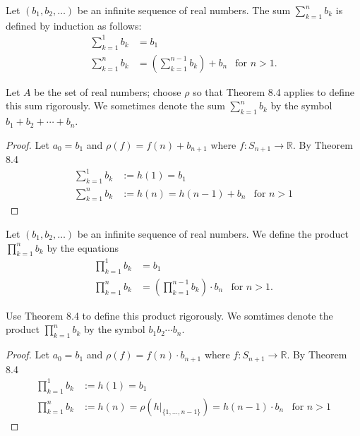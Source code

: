 \begin{exercise}\label{chapter1:section8:exercise1}
    Let $(b_{1}, b_{2}, \ldots)$ be an infinite sequence of real numbers. The sum $\sum^{n}_{k=1}b_{k}$ is defined by induction as follows:
    \begin{align*}
        \sum^{1}_{k=1}b_{k} & = b_{1}                                                            \\
        \sum^{n}_{k=1}b_{k} & = \left(\sum^{n-1}_{k=1}b_{k}\right) + b_{n} & \text{for $n > 1$.}
    \end{align*}

    Let $A$ be the set of real numbers; choose $\rho$ so that Theorem 8.4 applies to define this sum rigorously. We sometimes denote the sum $\sum^{n}_{k=1}b_{k}$ by the symbol $b_{1} + b_{2} + \cdots + b_{n}$.
\end{exercise}

\begin{proof}
    Let $a_{0} = b_{1}$ and $\rho(f) = f(n) + b_{n+1}$ where $f: S_{n+1}\to \mathbb{R}$. By Theorem 8.4
    \begin{align*}
        \sum^{1}_{k=1}b_{k} & := h(1) = b_{1}                               \\
        \sum^{n}_{k=1}b_{k} & := h(n) = h(n-1) + b_{n} & \text{for $n > 1$}
    \end{align*}
\end{proof}

\begin{exercise}\label{chapter1:section8:exercise2}
    Let $(b_{1}, b_{2}, \ldots)$ be an infinite sequence of real numbers. We define the product $\prod^{n}_{k=1}b_{k}$ by the equations
    \begin{align*}
        \prod^{1}_{k=1}b_{k} & = b_{1}                                                                 \\
        \prod^{n}_{k=1}b_{k} & = \left(\prod^{n-1}_{k=1}b_{k}\right) \cdot b_{n} & \text{for $n > 1$.}
    \end{align*}

    Use Theorem 8.4 to define this product rigorously. We somtimes denote the product $\prod^{n}_{k=1}b_{k}$ by the symbol $b_{1}b_{2}\cdots b_{n}$.
\end{exercise}

\begin{proof}
    Let $a_{0} = b_{1}$ and $\rho(f) = f(n)\cdot b_{n+1}$ where $f: S_{n+1}\to \mathbb{R}$. By Theorem 8.4
    \begin{align*}
        \prod^{1}_{k=1}b_{k} & := h(1) = b_{1}                                                                        \\
        \prod^{n}_{k=1}b_{k} & := h(n) = \rho(h\vert_{\{ 1, \ldots, n-1 \}}) = h(n-1)\cdot b_{n} & \text{for $n > 1$}
    \end{align*}
\end{proof}

